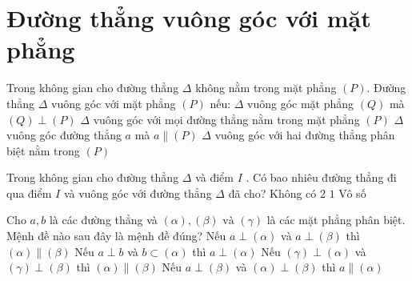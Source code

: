 \section{Đường thẳng vuông góc với mặt phẳng}
\begin{ex}%
	Trong không gian cho đường thẳng $\Delta $ không nằm trong mặt phẳng $(P)$. Đường thẳng $\Delta $ vuông góc với mặt phẳng $(P)$ nếu: 
	\choice
	{$\Delta $ vuông góc mặt phẳng $(Q)$ mà $(Q) \perp (P)$}
	{\True $\Delta $ vuông góc với mọi đường thẳng nằm trong mặt phẳng $(P)$}
	{$\Delta $ vuông góc đường thẳng $a$ mà $a\parallel(P)$}
	{$\Delta $ vuông góc với hai đường thẳng phân biệt nằm trong $(P)$}
\end{ex}
\begin{ex}%
	Trong không gian cho đường thẳng $ \Delta $ và điểm $ I $ . Có bao nhiêu đường thẳng đi qua điểm
	$ I $ và vuông góc với đường thẳng $ \Delta $ đã cho?
	\choice
	{Không có}
	{$ 2 $}
	{$ 1 $}
	{\True Vô số}
\end{ex}
\begin{ex}%
	Cho $ a,b$ là các đường thẳng và $ (\alpha), (\beta) \text{ và } (\gamma) $ là các mặt phẳng phân biệt. Mệnh đề nào sau đây là mệnh đề đúng?
	\choice
	{\True Nếu $ a \perp (\alpha) $ và $ a \perp (\beta) $ thì $ (\alpha) \parallel (\beta)$ }
	{Nếu $ a \perp b $ và $ b \subset (\alpha) $ thì $ a \perp (\alpha) $}
	{Nếu $ (\gamma) \perp (\alpha) $ và  $ (\gamma) \perp (\beta) $ thì $ (\alpha) \parallel (\beta)  $}
	{Nếu $ a \perp (\beta) $ và $ (\alpha) \perp (\beta) $ thì $ a \parallel (\alpha)  $}
	
\end{ex}
